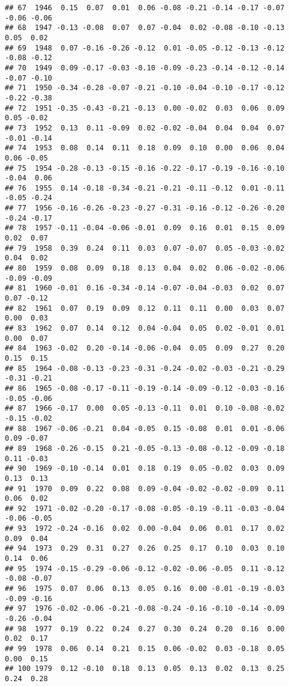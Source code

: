 \documentclass[]{article}
\begin{document}
\begin{verbatim}
## 67  1946  0.15  0.07  0.01  0.06 -0.08 -0.21 -0.14 -0.17 -0.07 -0.06 -0.06
## 68  1947 -0.13 -0.08  0.07  0.07 -0.04  0.02 -0.08 -0.10 -0.13  0.05  0.02
## 69  1948  0.07 -0.16 -0.26 -0.12  0.01 -0.05 -0.12 -0.13 -0.12 -0.08 -0.12
## 70  1949  0.09 -0.17 -0.03 -0.10 -0.09 -0.23 -0.14 -0.12 -0.14 -0.07 -0.10
## 71  1950 -0.34 -0.28 -0.07 -0.21 -0.10 -0.04 -0.10 -0.17 -0.12 -0.22 -0.38
## 72  1951 -0.35 -0.43 -0.21 -0.13  0.00 -0.02  0.03  0.06  0.09  0.05 -0.02
## 73  1952  0.13  0.11 -0.09  0.02 -0.02 -0.04  0.04  0.04  0.07 -0.01 -0.14
## 74  1953  0.08  0.14  0.11  0.18  0.09  0.10  0.00  0.06  0.04  0.06 -0.05
## 75  1954 -0.28 -0.13 -0.15 -0.16 -0.22 -0.17 -0.19 -0.16 -0.10 -0.04  0.06
## 76  1955  0.14 -0.18 -0.34 -0.21 -0.21 -0.11 -0.12  0.01 -0.11 -0.05 -0.24
## 77  1956 -0.16 -0.26 -0.23 -0.27 -0.31 -0.16 -0.12 -0.26 -0.20 -0.24 -0.17
## 78  1957 -0.11 -0.04 -0.06 -0.01  0.09  0.16  0.01  0.15  0.09  0.02  0.07
## 79  1958  0.39  0.24  0.11  0.03  0.07 -0.07  0.05 -0.03 -0.02  0.04  0.02
## 80  1959  0.08  0.09  0.18  0.13  0.04  0.02  0.06 -0.02 -0.06 -0.09 -0.09
## 81  1960 -0.01  0.16 -0.34 -0.14 -0.07 -0.04 -0.03  0.02  0.07  0.07 -0.12
## 82  1961  0.07  0.19  0.09  0.12  0.11  0.11  0.00  0.03  0.07  0.00  0.03
## 83  1962  0.07  0.14  0.12  0.04 -0.04  0.05  0.02 -0.01  0.01  0.00  0.07
## 84  1963 -0.02  0.20 -0.14 -0.06 -0.04  0.05  0.09  0.27  0.20  0.15  0.15
## 85  1964 -0.08 -0.13 -0.23 -0.31 -0.24 -0.02 -0.03 -0.21 -0.29 -0.31 -0.21
## 86  1965 -0.08 -0.17 -0.11 -0.19 -0.14 -0.09 -0.12 -0.03 -0.16 -0.05 -0.06
## 87  1966 -0.17  0.00  0.05 -0.13 -0.11  0.01  0.10 -0.08 -0.02 -0.15 -0.02
## 88  1967 -0.06 -0.21  0.04 -0.05  0.15 -0.08  0.01  0.01 -0.06  0.09 -0.07
## 89  1968 -0.26 -0.15  0.21 -0.05 -0.13 -0.08 -0.12 -0.09 -0.18  0.11 -0.03
## 90  1969 -0.10 -0.14  0.01  0.18  0.19  0.05 -0.02  0.03  0.09  0.13  0.13
## 91  1970  0.09  0.22  0.08  0.09 -0.04 -0.02 -0.02 -0.09  0.11  0.06  0.02
## 92  1971 -0.02 -0.20 -0.17 -0.08 -0.05 -0.19 -0.11 -0.03 -0.04 -0.06 -0.05
## 93  1972 -0.24 -0.16  0.02  0.00 -0.04  0.06  0.01  0.17  0.02  0.09  0.04
## 94  1973  0.29  0.31  0.27  0.26  0.25  0.17  0.10  0.03  0.10  0.14  0.06
## 95  1974 -0.15 -0.29 -0.06 -0.12 -0.02 -0.06 -0.05  0.11 -0.12 -0.08 -0.07
## 96  1975  0.07  0.06  0.13  0.05  0.16  0.00 -0.01 -0.19 -0.03 -0.09 -0.16
## 97  1976 -0.02 -0.06 -0.21 -0.08 -0.24 -0.16 -0.10 -0.14 -0.09 -0.26 -0.04
## 98  1977  0.19  0.22  0.24  0.27  0.30  0.24  0.20  0.16  0.00  0.02  0.17
## 99  1978  0.06  0.14  0.21  0.15  0.06 -0.02  0.03 -0.18  0.05  0.00  0.15
## 100 1979  0.12 -0.10  0.18  0.13  0.05  0.13  0.02  0.13  0.25  0.24  0.28

\end{verbatim}
\end{document}

